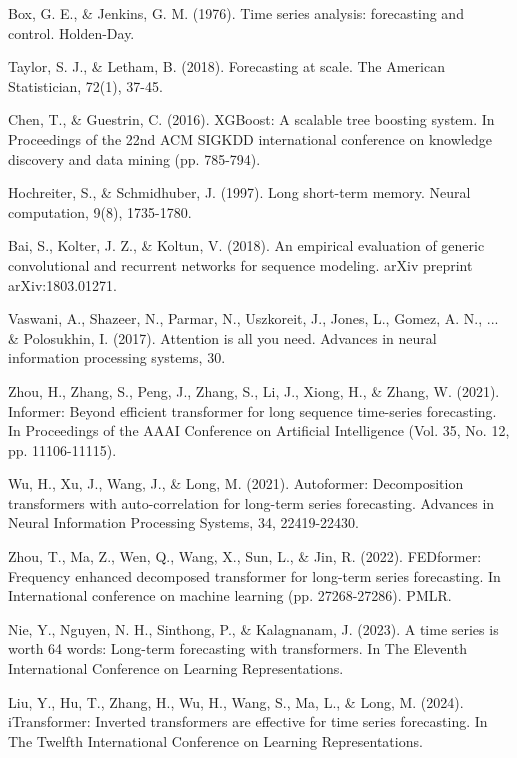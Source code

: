 \documentclass[11pt]{article}
\begin{document}

\begin{thebibliography}{99}

Box, G. E., \& Jenkins, G. M. (1976). Time series analysis: forecasting and control. Holden-Day.

Taylor, S. J., \& Letham, B. (2018). Forecasting at scale. The American Statistician, 72(1), 37-45.

Chen, T., \& Guestrin, C. (2016). XGBoost: A scalable tree boosting system. In Proceedings of the 22nd ACM SIGKDD international conference on knowledge discovery and data mining (pp. 785-794).

Hochreiter, S., \& Schmidhuber, J. (1997). Long short-term memory. Neural computation, 9(8), 1735-1780.

Bai, S., Kolter, J. Z., \& Koltun, V. (2018). An empirical evaluation of generic convolutional and recurrent networks for sequence modeling. arXiv preprint arXiv:1803.01271.

Vaswani, A., Shazeer, N., Parmar, N., Uszkoreit, J., Jones, L., Gomez, A. N., ... \& Polosukhin, I. (2017). Attention is all you need. Advances in neural information processing systems, 30.

Zhou, H., Zhang, S., Peng, J., Zhang, S., Li, J., Xiong, H., \& Zhang, W. (2021). Informer: Beyond efficient transformer for long sequence time-series forecasting. In Proceedings of the AAAI Conference on Artificial Intelligence (Vol. 35, No. 12, pp. 11106-11115).

Wu, H., Xu, J., Wang, J., \& Long, M. (2021). Autoformer: Decomposition transformers with auto-correlation for long-term series forecasting. Advances in Neural Information Processing Systems, 34, 22419-22430.

Zhou, T., Ma, Z., Wen, Q., Wang, X., Sun, L., \& Jin, R. (2022). FEDformer: Frequency enhanced decomposed transformer for long-term series forecasting. In International conference on machine learning (pp. 27268-27286). PMLR.

Nie, Y., Nguyen, N. H., Sinthong, P., \& Kalagnanam, J. (2023). A time series is worth 64 words: Long-term forecasting with transformers. In The Eleventh International Conference on Learning Representations.

Liu, Y., Hu, T., Zhang, H., Wu, H., Wang, S., Ma, L., \& Long, M. (2024). iTransformer: Inverted transformers are effective for time series forecasting. In The Twelfth International Conference on Learning Representations.


\end{thebibliography}
\end{document}
